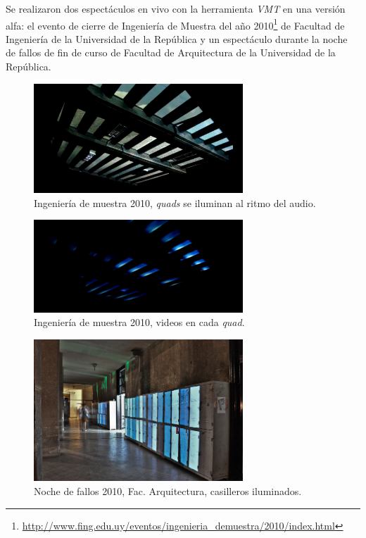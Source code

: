 Se realizaron dos espectáculos en vivo con la herramienta \emph{VMT} en una versión alfa: el evento de cierre de Ingeniería de Muestra del año 2010\footnote{\url{http://www.fing.edu.uy/eventos/ingenieria_demuestra/2010/index.html}} de Facultad de Ingeniería de la Universidad de la República y un espectáculo durante la noche de fallos de fin de curso de Facultad de Arquitectura de la Universidad de la República.
\begin{figure}[H]
  \centering
    \includegraphics[width=0.7\textwidth]{./Cap7_conclusiones/ingMuestra1.png}
  \caption[Imagen propia]{Ingeniería de muestra 2010, \emph{quads} se iluminan al ritmo del audio.}
  \label{fig:ingMuestra1}
\end{figure}
\begin{figure}[H]
  \centering
    \includegraphics[width=0.7\textwidth]{./Cap7_conclusiones/ingMuestra2.png}
  \caption[Imagen propia]{Ingeniería de muestra 2010, videos en cada \emph{quad}.}
  \label{fig:ingMuestra2}
\end{figure}

\begin{figure}[H]
  \centering
    \includegraphics[width=0.7\textwidth]{./Cap7_conclusiones/Arqui1.jpg}
  \caption[http://www.farq.edu.uy/patio/conferencias-exposiciones-y-seminarios/noche-de-fallos-7.html]{Noche de fallos 2010, Fac. Arquitectura, casilleros iluminados.}
  \label{fig:Arquitectura1}
\end{figure}

